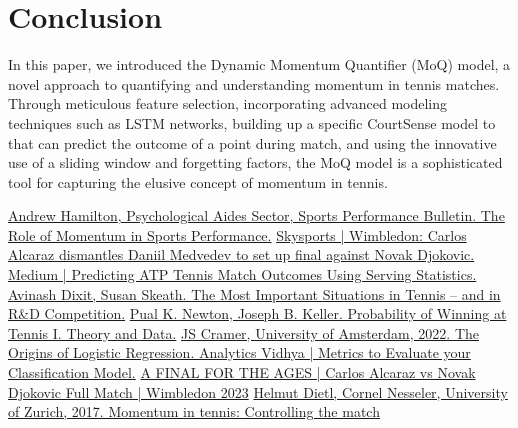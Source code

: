 \documentclass[12pt]{article}  %
\begin{document}
\section{Conclusion}
In this paper, we introduced the Dynamic Momentum Quantifier (MoQ) model, a novel approach to quantifying and understanding momentum in tennis matches. Through meticulous feature selection, incorporating advanced modeling techniques such as LSTM networks, building up a specific CourtSense model to that can predict the outcome of a point during match, and using the innovative use of a sliding window and forgetting factors, the MoQ model is a sophisticated tool for capturing the elusive concept of momentum in tennis.


\clearpage   
\begin{thebibliography}{99}
	 \href{https://www.sportsperformancebulletin.com/psychology/psychological-aides/the-role-of-momentum-in-sports-performance}{Andrew Hamilton, Psychological Aides Sector, Sports Performance Bulletin. The Role of Momentum in Sports Performance.}
     \href{https://www.skysports.com/tennis/news/32498/12920986/wimbledon-carlos-alcaraz-dismantles-daniil-medvedev-to-set-up-final-against-novak-djokovic}{Skysports | Wimbledon: Carlos Alcaraz dismantles Daniil Medvedev to set up final against Novak Djokovic.}
	 \href{https://medium.com/swlh/cde03d99f410}{Medium | Predicting ATP Tennis Match Outcomes Using Serving Statistics.}
	 \href{https://www.princeton.edu/~dixitak/home/Tennis.pdf}{Avinash Dixit, Susan Skeath. The Most Important Situations in Tennis – and in R\&D Competition.}
	 \href{https://www.cis.upenn.edu/~bhusnur4/cit592\_fall2013/NeKe2005.pdf}{Pual K. Newton, Joseph B. Keller. Probability of Winning at Tennis I. Theory and Data.}
	 \href{https://papers.tinbergen.nl/02119.pdf}{JS Cramer, University of Amsterdam, 2022. The Origins of Logistic Regression. }
	 \href{https://www.analyticsvidhya.com/blog/2021/07/metrics-to-evaluate-your-classification-model-to-take-the-right-decisions/}{Analytics Vidhya | Metrics to Evaluate your Classification Model.}
	 \href{https://www.youtube.com/watch?v=5uFAkizQNJI}{A FINAL FOR THE AGES | Carlos Alcaraz vs Novak Djokovic Full Match | Wimbledon 2023}
	 \href{https://www.researchgate.net/publication/318275570_Momentum_in_tennis_Controlling_the_match}{Helmut Dietl, Cornel Nesseler, University of Zurich, 2017. Momentum in tennis: Controlling the match}

\end{thebibliography}
\end{document}
